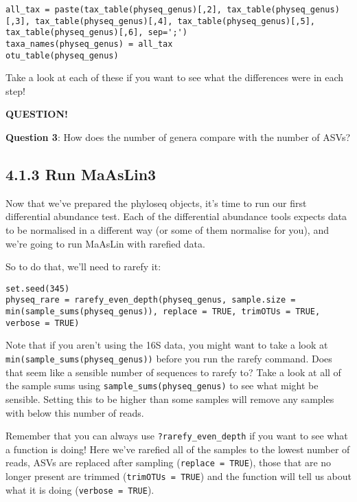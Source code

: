 \documentclass[
]{book}
\newenvironment{bluebox}{
  \definecolor{shadecolor}{RGB}{172, 210, 237}
  \color{white}
  \begin{shaded}}
 {\end{shaded}}
\begin{document}
\begin{verbatim}
all_tax = paste(tax_table(physeq_genus)[,2], tax_table(physeq_genus)[,3], tax_table(physeq_genus)[,4], tax_table(physeq_genus)[,5], tax_table(physeq_genus)[,6], sep=';')
taxa_names(physeq_genus) = all_tax
otu_table(physeq_genus)
\end{verbatim}

Take a look at each of these if you want to see what the differences were in each step!

\begin{bluebox}

\begin{center}
\textbf{QUESTION!}

\end{center}

\textbf{Question 3}: How does the number of genera compare with the number of ASVs?

\end{bluebox}

\subsection{4.1.3 Run MaAsLin3}\label{run-maaslin3}

Now that we've prepared the phyloseq objects, it's time to run our first differential abundance test. Each of the differential abundance tools expects data to be normalised in a different way (or some of them normalise for you), and we're going to run MaAsLin with rarefied data.

So to do that, we'll need to rarefy it:

\begin{verbatim}
set.seed(345)
physeq_rare = rarefy_even_depth(physeq_genus, sample.size = min(sample_sums(physeq_genus)), replace = TRUE, trimOTUs = TRUE, verbose = TRUE)
\end{verbatim}

Note that if you aren't using the 16S data, you might want to take a look at \texttt{min(sample\_sums(physeq\_genus))} before you run the rarefy command. Does that seem like a sensible number of sequences to rarefy to? Take a look at all of the sample sums using \texttt{sample\_sums(physeq\_genus)} to see what might be sensible. Setting this to be higher than some samples will remove any samples with below this number of reads.

Remember that you can always use \texttt{?rarefy\_even\_depth} if you want to see what a function is doing!
Here we've rarefied all of the samples to the lowest number of reads, ASVs are replaced after sampling (\texttt{replace\ =\ TRUE}), those that are no longer present are trimmed (\texttt{trimOTUs\ =\ TRUE}) and the function will tell us about what it is doing (\texttt{verbose\ =\ TRUE}).
\end{document}
